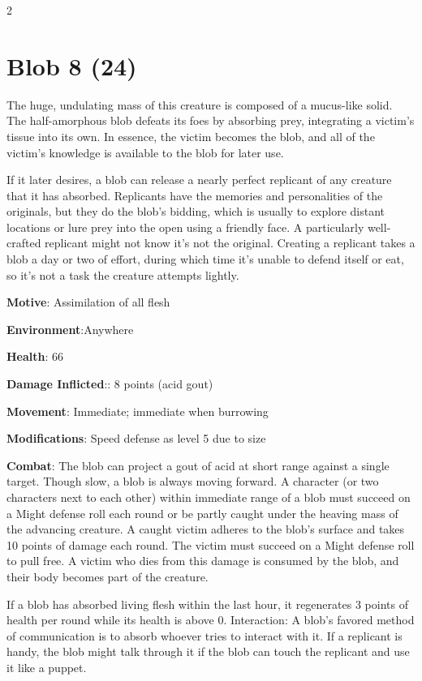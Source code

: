 \begin{multicols}{2}

\section{Blob 8 (24)}

The huge, undulating mass of this creature is composed of a mucus-like solid. The half-amorphous blob defeats its foes by absorbing prey, integrating a victim’s tissue into its own. In essence, the victim becomes the blob, and all of the victim’s knowledge is available to the blob for later use.

If it later desires, a blob can release a nearly perfect replicant of any creature that it has absorbed. Replicants have the memories and personalities of the originals, but they do the blob’s bidding, which is usually to explore distant locations or lure prey into the open using a friendly face. A particularly well-crafted replicant might not know it’s not the original. Creating a replicant takes a blob a day or two of effort, during which time it’s unable to defend itself or eat, so it’s not a task the creature attempts lightly.

\textbf{Motive}: Assimilation of all flesh

\textbf{Environment}:Anywhere

\textbf{Health}: 66

\textbf{Damage Inflicted}:: 8 points (acid gout)

\textbf{Movement}: Immediate; immediate when burrowing

\textbf{Modifications}: Speed defense as level 5 due to size

\textbf{Combat}: The blob can project a gout of acid at short range against a single target. Though slow, a blob is always moving forward. A character (or two characters next to each other) within immediate range of a blob must succeed on a Might defense roll each round or be partly caught under the heaving mass of the advancing creature. A caught victim adheres to the blob’s surface and takes 10 points of damage each round. The victim must succeed on a Might defense roll to pull free. A victim who dies from this damage is consumed by the blob, and their body becomes part of the creature.

If a blob has absorbed living flesh within the last hour, it regenerates 3 points of health per round while its health is above 0.
Interaction: A blob’s favored method of communication is to absorb whoever tries to interact with it. If a replicant is handy, the blob might talk through it if the blob can touch the replicant and use it like a puppet.


\end{multicols}
